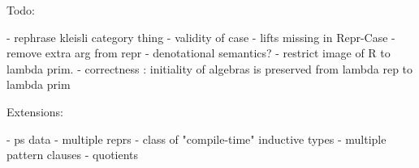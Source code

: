 Todo:

- rephrase kleisli category thing
- validity of case
- lifts missing in Repr-Case
- remove extra arg from repr
- denotational semantics?
- restrict image of R to lambda prim.
- correctness : initiality of algebras is preserved from lambda rep to lambda prim

Extensions:

- ps data
- multiple reprs
- class of "compile-time" inductive types
- multiple pattern clauses
- quotients
